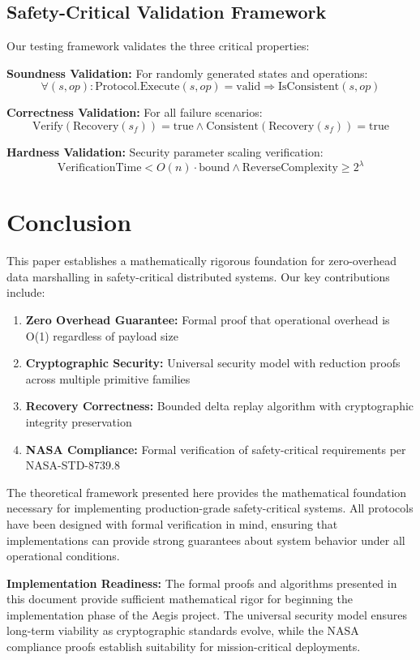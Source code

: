 \documentclass[11pt,a4paper]{article}
\theoremstyle{definition}
\theoremstyle{remark}
\begin{document}
\subsection{Safety-Critical Validation Framework}

Our testing framework validates the three critical properties:

\textbf{Soundness Validation:} For randomly generated states and operations:
$$\forall (s, op) : \text{Protocol.Execute}(s, op) = \text{valid} \Rightarrow \text{IsConsistent}(s, op)$$

\textbf{Correctness Validation:} For all failure scenarios:
$$\text{Verify}(\text{Recovery}(s_f)) = \text{true} \land \text{Consistent}(\text{Recovery}(s_f)) = \text{true}$$

\textbf{Hardness Validation:} Security parameter scaling verification:
$$\text{VerificationTime} < O(n) \cdot \text{bound} \land \text{ReverseComplexity} \geq 2^{\lambda}$$

\section{Conclusion}

This paper establishes a mathematically rigorous foundation for zero-overhead data marshalling in safety-critical distributed systems. Our key contributions include:

\begin{enumerate}
    \item \textbf{Zero Overhead Guarantee:} Formal proof that operational overhead is O(1) regardless of payload size
    \item \textbf{Cryptographic Security:} Universal security model with reduction proofs across multiple primitive families
    \item \textbf{Recovery Correctness:} Bounded delta replay algorithm with cryptographic integrity preservation
    \item \textbf{NASA Compliance:} Formal verification of safety-critical requirements per NASA-STD-8739.8
\end{enumerate}

The theoretical framework presented here provides the mathematical foundation necessary for implementing production-grade safety-critical systems. All protocols have been designed with formal verification in mind, ensuring that implementations can provide strong guarantees about system behavior under all operational conditions.

\textbf{Implementation Readiness:} The formal proofs and algorithms presented in this document provide sufficient mathematical rigor for beginning the implementation phase of the Aegis project. The universal security model ensures long-term viability as cryptographic standards evolve, while the NASA compliance proofs establish suitability for mission-critical deployments.
\end{document}
